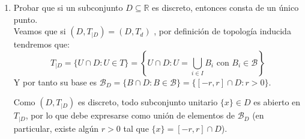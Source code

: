\documentclass[12pt]{article}
\begin{document}
\begin{ejercicio}
\begin{enumerate}
\begin{itemize}
    \item \textbf{Ahora veamos que $C^\circ = ]-3, 3[$:}
    \begin{itemize}
        \item[$\subseteq$)] Probemos por contrarrecíproco que si $x \in \bb{R} \setminus ]-3, 3[$, entonces $x \notin C^\circ$. \\
        Sea $x \in \bb{R} \setminus ]-3, 3[$, es decir, $|x| \ge 3$. Como $x \neq 0$, su único entorno básico es $[-|x|, |x|]$. Dado que $|x| \ge 3 \Rightarrow [-|x|, |x|]\nsubseteq C$, lo que equivale a probar que $[-|x|, |x|]\cap(\bb{R}\setminus C)\neq \emptyset$.\\
        Efectivamente $-3\in [-|x|, |x|]\cap(\bb{R}\setminus C) \Rightarrow [-|x|, |x|] \nsubseteq C$, lo que implica que ningún entorno de $x$ está contenido en $C$, luego $x \notin C^\circ$. Por contrarrecíproco, $C^\circ \subseteq ]-3, 3[$.

        \item[$\supseteq$)] Sea $x \in ]-3, 3[$. Si $x = 0$, el básico $[-1, 1]$ es un entorno de $0$ contenido en $(-3, 5)$, luego $0 \in C^\circ$. \\
        Si $x \in ]-3, 3[ \setminus \{0\}$, entonces $|x| < 3$, por lo que su entorno básico cumple:
        \[
            x \in [-|x|, |x|] \subseteq ]-3, 3[ \subseteq (-3, 5) = C,
        \]
        de donde concluimos directamente que $x \in C^\circ$.
    \end{itemize}
\end{itemize}
        \item Probar que si un subconjunto $D\subseteq \mathbb{R}$ es discreto, entonces consta de un único punto.\\
        Veamos que si $(D, T_{|D}) = (D, T_d)$ , por definición de topología inducida tendremos que:
        \[
            T_{|D} = \{U \cap D : U \in T\} = \left\{ U \cap D : U = \bigcup_{i \in I} B_i \text{ con } B_i \in \mathcal{B} \right\}
        \]
        Y por tanto su base es $\mathcal{B}_D = \{B \cap D : B \in \mathcal{B}\} = \{[-r, r] \cap D : r > 0\}$.
        
        Como $(D, T_{|D})$ es discreto, todo subconjunto unitario $\{x\}\in D$ es abierto en $T_{|D}$, por lo que debe expresarse como unión de elementos de $\mathcal{B}_D$ (en particular, existe algún $r > 0$ tal que $\{x\} = [-r, r] \cap D$).
        

\end{enumerate}
\end{ejercicio}
\end{document}
